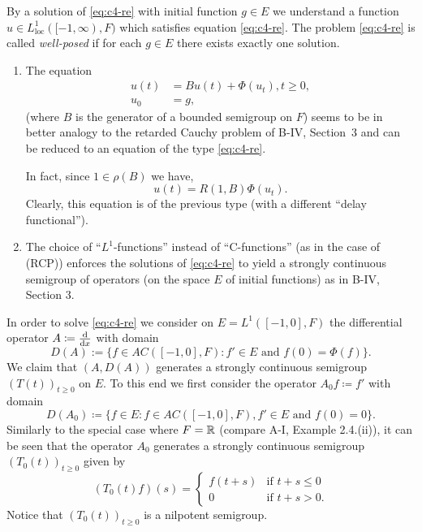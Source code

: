 By a solution of \eqref{eq:c4-re} with initial function $g \in E$ we understand a function $u \in L^{1}_{\mathrm{loc}}([-1,\infty),F)$ which satisfies equation \eqref{eq:c4-re}.
The problem \eqref{eq:c4-re} is called \emph{well-posed} if for each $g \in E$ there exists exactly one solution.
\begin{remarks*}
\begin{enumerate}[\upshape (i), wide, labelindent=.5em] 
\item \label{rem:c4-kgk-1}
The equation
\begin{align*}
u(t) &= Bu(t) + \Phi(u_t), t \geq 0,\\
u_0 &= g,
\end{align*}
(where $B$ is the generator of a bounded semigroup on $F$) seems to be in better analogy to the retarded Cauchy problem of B-IV, Section~3 and can be reduced to an equation of the type \eqref{eq:c4-re}.

In fact, since $1 \in \rho(B)$ we have,
\begin{equation*}\label{eq:c4-3.0-KGK1}
u(t) = R(1,B)\Phi(u_{t}).
\end{equation*}
Clearly, this equation is of the previous type (with a different \enquote{delay functional}).
\item \label{rem:c4-kgk-2}
The choice of \enquote{$L^{1}$-functions} instead of \enquote{C-functions} (as in the case of (RCP)) enforces the solutions of \eqref{eq:c4-re} to yield a strongly continuous semigroup of operators (on the space $E$ of initial functions) as in B-IV, Section 3.
\end{enumerate}
\end{remarks*}
In order to solve \eqref{eq:c4-re} we consider on $E = L^{1}([-1,0],F)$ the differential operator $A \coloneq  \frac{\mathop{}\!\mathrm{d}{}}{\mathop{}\!\mathrm{d}{x}}$ with domain
\begin{equation*}\label{eq:c4-3.0-KGK2}
D(A):=\{f \in AC([-1,0],F) \colon f' \in E \text{ and } f(0) = \Phi(f)\}.
\end{equation*}
We claim that $(A,D(A))$ generates a strongly continuous semigroup $(T(t))_{t\geq 0}$ on $E$.
To this end we first consider the operator $A_0 f \coloneqq f'$ with domain
\begin{equation*}\label{eq:c4-3.0-KGK3}
D(A_0) \coloneqq \{f \in E \colon f \in AC([-1,0],F), f' \in E \text{ and } f(0) = 0\}.
\end{equation*}
Similarly to the special case where $F = \mathbb{R}$ (compare A-I, Example 2.4.(ii)), it can be seen that the operator $A_0$ generates a strongly continuous semigroup $(T_0(t))_{t\geq 0}$ given by
\begin{equation}\label{eq:c4-3.1}
(T_0(t)f)(s) = \begin{cases}
    f(t+s) & \text{if } t+s \leq 0 \\
    0 & \text{if } t+s > 0.
\end{cases}
\end{equation}
Notice that $(T_0(t))_{t \geq 0}$ is a nilpotent semigroup.


